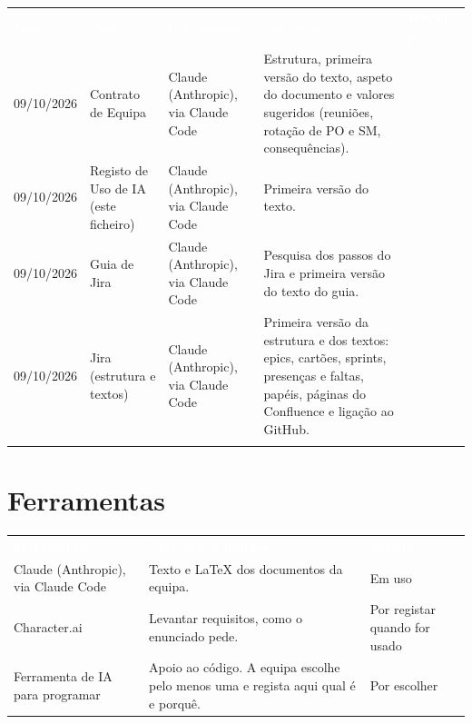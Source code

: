\documentclass[11pt,a4paper]{article}
\newcommand{\th}[1]{\textcolor{white}{\sffamily\bfseries #1}}
\begin{document}
\small
\renewcommand{\arraystretch}{1.5}
\begin{tabularx}{\textwidth}{L{2.0cm} L{2.7cm} L{2.7cm} Y L{2.0cm}}
   \th{Data} & \th{Onde} & \th{Ferramenta} & \th{Para quê} & \th{Revisto por} \\
  09/10/2026 & Contrato de Equipa & Claude (Anthropic), via Claude Code &
    Estrutura, primeira versão do texto, aspeto do documento e valores sugeridos (reuniões, rotação de PO e SM, consequências). & \\
  09/10/2026 & Registo de Uso de IA (este ficheiro) & Claude (Anthropic), via Claude Code &
    Primeira versão do texto. & \\
  09/10/2026 & Guia de Jira & Claude (Anthropic), via Claude Code &
    Pesquisa dos passos do Jira e primeira versão do texto do guia. & \\
  09/10/2026 & Jira (estrutura e textos) & Claude (Anthropic), via Claude Code &
    Primeira versão da estrutura e dos textos: epics, cartões, sprints, presenças e faltas, papéis, páginas do Confluence e ligação ao GitHub. & \\
   \rule{0pt}{2.2em} & & & & \\
  \bottomrule
\end{tabularx}
\renewcommand{\arraystretch}{1}
\normalsize

\section{Ferramentas}

\small
\renewcommand{\arraystretch}{1.5}
\begin{tabularx}{\textwidth}{N{4.4cm} Y L{3.2cm}}
   \th{Ferramenta} & \th{Para que a usamos} & \th{Estado} \\
  Claude (Anthropic), via Claude Code & Texto e LaTeX dos documentos da equipa. & Em uso \\
  Character.ai & Levantar requisitos, como o enunciado pede. & Por registar quando for usado \\
  Ferramenta de IA para programar & Apoio ao código. A equipa escolhe pelo menos uma e regista aqui qual é e porquê. & Por escolher \\
  \bottomrule
\end{tabularx}
\renewcommand{\arraystretch}{1}
\normalsize
\end{document}
